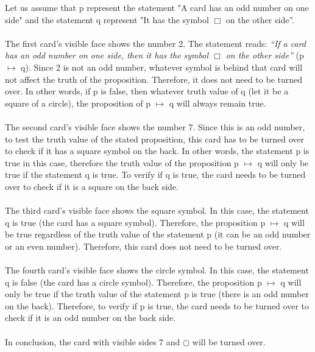 Let us assume that p represent the statement "A card has an odd number on one side" and the statement q represent "It has the symbol $\Box$ on the other side''. \\ \\
The first card's visible face shows the number 2. The statement reads: \textit{``If a card has an odd number on one side, then it has the symbol $\Box$ on the other side''} (p $\mapsto$ q). Since 2 is not an odd number, whatever symbol is behind that card will not affect the truth of the proposition. Therefore, it does not need to be turned over. In other words, if p is false, then whatever truth value of q (let it be a square of a circle), the proposition of p $\mapsto$ q will always remain true.\\ \\
The second card's visible face shows the number 7. Since this is an odd number, to test the truth value of the stated proposition, this card has to be turned over to check if it has a square symbol on the back. In other words, the statement p is true in this case, therefore the truth value of the proposition p $\mapsto$ q will only be true if the statement q is true. To verify if q is true, the card needs to be turned over to check if it is a square on the back side.\\ \\
The third card's visible face shows the square symbol. In this case, the statement q is true (the card has a square symbol). Therefore, the proposition p $\mapsto$ q will be true regardless of the truth value of the statement p (it can be an odd number or an even number). Therefore, this card does not need to be turned over.\\ \\ 
The fourth card's visible face shows the circle symbol. In this case, the statement q is false (the card has a circle symbol). Therefore, the proposition p $\mapsto$ q will only be true if the truth value of the statement p is true (there is an odd number on the back). Therefore, to verify if p is true, the card needs to be turned over to check if it is an odd number on the back side.\\ \\
In conclusion, the card with visible sides 7 and $\bigcirc$ will be turned over.
